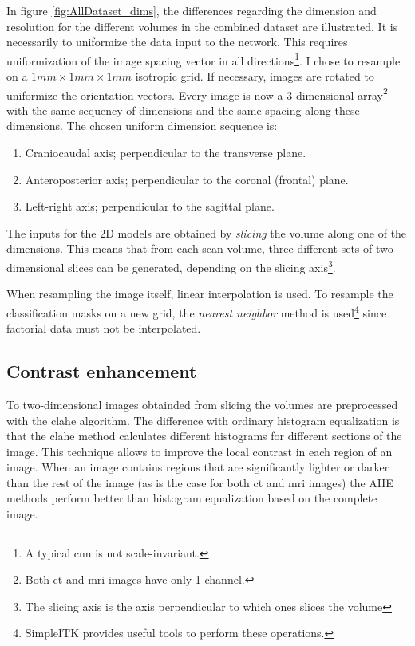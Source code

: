 In figure \ref{fig:AllDataset_dims}, the differences regarding the dimension and resolution for the different volumes in the combined dataset are illustrated. 
It is necessarily to uniformize the data input to the network. 
This requires uniformization of the image spacing vector in all directions\footnote{A typical \acrshort{cnn} is not scale-invariant.}. 
I chose to resample on a $1mm\times 1mm \times 1mm$ isotropic grid. 
If necessary, images are rotated to uniformize the orientation vectors. 
Every image is now a 3-dimensional array\footnote{Both \acrshort{ct} and \acrshort{mri} images have only 1 channel.} with the same sequency of dimensions and the same spacing along these dimensions.
The chosen uniform dimension sequence is:
\begin{enumerate} 
    \item Craniocaudal axis; perpendicular to the transverse plane.
    \item Anteroposterior axis; perpendicular to the coronal (frontal) plane.
    \item Left-right axis; perpendicular to the sagittal plane.
\end{enumerate}
The inputs for the 2D models are obtained by \textit{slicing} the volume along one of the dimensions.
This means that from each scan volume, three different sets of two-dimensional slices can be generated, depending on the slicing axis\footnote{The slicing axis is the axis perpendicular to which ones slices the volume}.

When resampling the image itself, linear interpolation is used. 
To resample the classification masks on a new grid, the \textit{nearest neighbor} method is used\footnote{
    SimpleITK \cite{sitk} provides useful tools to perform these operations.
    } 
since factorial data must not be interpolated. 

\subsection{Contrast enhancement}
To two-dimensional images obtainded from slicing the volumes are preprocessed with the \acrfull{clahe} algorithm. 
The difference with ordinary histogram equalization is that the \acrshort{clahe} method calculates different histograms for different sections of the image.
This technique allows to improve the local contrast in each region of an image.
When an image contains regions that are significantly lighter or darker than the rest of the image (as is the case for both \acrshort{ct} and \acrshort{mri} images) the AHE methods perform better than histogram equalization based on the complete image.


